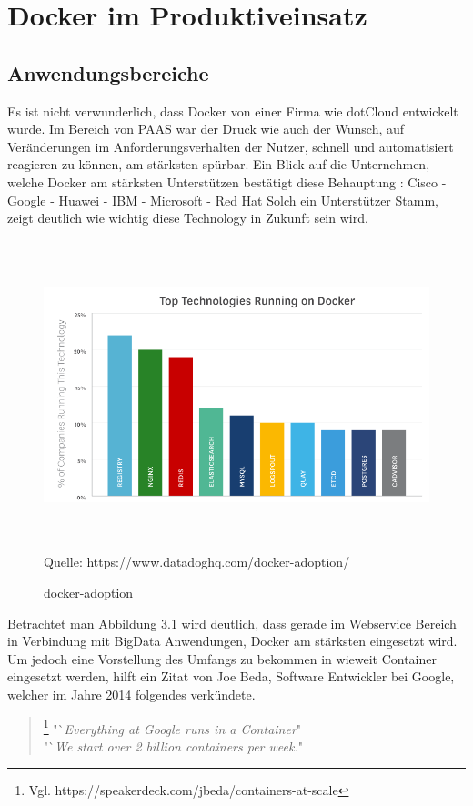 \documentclass[12pt,toc=bib,toc=listof]{scrreprt}
\begin{document}

\chapter{Docker im Produktiveinsatz}
\section{Anwendungsbereiche}
Es ist nicht verwunderlich, dass Docker von einer Firma wie dotCloud entwickelt wurde.
Im Bereich von PAAS war der Druck wie auch der Wunsch, auf Veränderungen im Anforderungsverhalten der Nutzer, schnell und automatisiert reagieren zu können, am stärksten spürbar. 
Ein Blick auf die Unternehmen, welche Docker am stärksten Unterstützen bestätigt diese Behauptung :
Cisco - Google - Huawei - IBM - Microsoft - Red Hat
Solch ein Unterstützer Stamm, zeigt deutlich wie wichtig diese Technology in Zukunft sein wird.

\begin{figure}
	\centering
	\caption{docker-adoption}
	\includegraphics[width=15cm, height=9cm, scale=0.3]{docker-adoption.png}
	Quelle: https://www.datadoghq.com/docker-adoption/
\end{figure}

Betrachtet man Abbildung 3.1 wird deutlich, dass gerade im Webservice Bereich in Verbindung mit BigData Anwendungen, Docker am stärksten eingesetzt wird.
Um jedoch eine Vorstellung des Umfangs zu bekommen in wieweit Container eingesetzt werden, hilft ein Zitat von Joe Beda, Software Entwickler bei Google, welcher im Jahre 2014 folgendes verkündete.

\begin{quote}
	\footnote[1]{Vgl. https://speakerdeck.com/jbeda/containers-at-scale}
	"`\textit{Everything at Google runs in a Container}"\\
	"`\textit{We start over 2 billion containers per week.}"
\end{quote}
\end{document}
